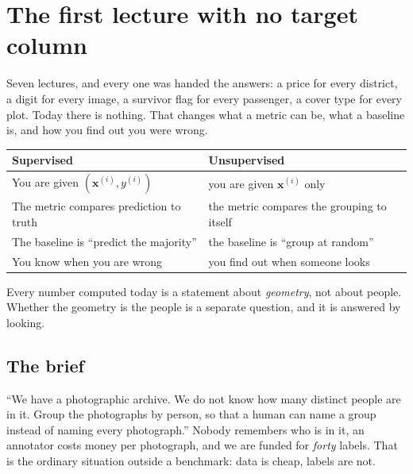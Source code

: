 \documentclass[11pt,a4paper]{article}
\begin{document}

\section{The first lecture with no target column}

Seven lectures, and every one was handed the answers: a price for every
district, a digit for every image, a survivor flag for every passenger, a cover
type for every plot. Today there is nothing. That changes what a metric can be,
what a baseline is, and how you find out you were wrong.

\begin{center}
\small
\begin{tabular}{p{}p{}}
\toprule
\textbf{Supervised} & \textbf{Unsupervised} \\
\midrule
You are given $(\mathbf{x}^{(i)}, y^{(i)})$ & you are given $\mathbf{x}^{(i)}$
                                              only \\
The metric compares prediction to truth & the metric compares the grouping to
                                          itself \\
The baseline is ``predict the majority'' & the baseline is ``group at
                                           random'' \\
You know when you are wrong & you find out when someone looks \\
\bottomrule
\end{tabular}
\end{center}

\begin{keybox}[title={The consequence for the whole hour}]
Every number computed today is a statement about \emph{geometry}, not about
people. Whether the geometry is the people is a separate question, and it is
answered by looking.
\end{keybox}

\subsection{The brief}

``We have a photographic archive. We do not know how many distinct people are
in it. Group the photographs by person, so that a human can name a group
instead of naming every photograph.'' Nobody remembers who is in it, an
annotator costs money per photograph, and we are funded for \emph{forty}
labels. That is the ordinary situation outside a benchmark: data is cheap,
labels are not.
\end{document}
